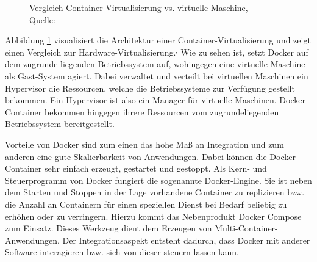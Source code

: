 \begin{figure}[h]
	\centering
	\captionsetup{justification=centering, format=plain}
	\hspace{1cm}
	\caption[Vergleich Container-Virtualisierung vs. virtuelle Maschine]{\label{fig:docker_container}Vergleich Container-Virtualisierung vs. virtuelle Maschine, \\Quelle: \cite{MS-DockerInc..05.03.2019}}
\end{figure}

Abbildung \ref{fig:docker_container} visualisiert die Architektur einer Container-Virtualisierung und zeigt einen Vergleich zur Hardware-Virtualisierung.\autocite[Vgl.][]{MS-ChrissiKraus.27.07.2018}$^,$\autocite[Vgl.][]{MS-MicrosoftCorporation.31.08.2018} 
Wie zu sehen ist, setzt Docker auf dem zugrunde liegenden Betriebssystem auf, wohingegen eine virtuelle Maschine als Gast-System agiert. 
Dabei verwaltet und verteilt bei virtuellen Maschinen ein Hypervisor die Ressourcen, welche die Betriebssysteme zur Verfügung gestellt bekommen. 
Ein Hypervisor ist also ein Manager für virtuelle Maschinen\autocite[Vgl.][]{MS-ReneBust.06.04.2010}. 
Docker-Container bekommen hingegen ihrere Ressourcen vom zugrundeliegenden Betriebssystem bereitgestellt.

Vorteile von Docker sind zum einen das hohe Maß an Integration und zum anderen eine gute Skalierbarkeit von Anwendungen. 
Dabei können die Docker-Container sehr einfach erzeugt, gestartet und gestoppt. 
Als Kern- und Steuerprogramm von Docker fungiert die sogenannte Docker-Engine. 
Sie ist neben dem Starten und Stoppen in der Lage vorhandene Container zu replizieren bzw. die Anzahl an Containern für einen speziellen Dienst bei Bedarf beliebig zu erhöhen oder zu verringern.
Hierzu kommt das Nebenprodukt Docker Compose zum Einsatz. 
Dieses Werkzeug dient dem Erzeugen von Multi-Container-Anwendungen.
Der Integrationsaspekt entsteht dadurch, dass Docker mit anderer Software interagieren bzw. sich von dieser steuern lassen kann.\autocite[Vgl.][]{MS-Docker-Compose} 